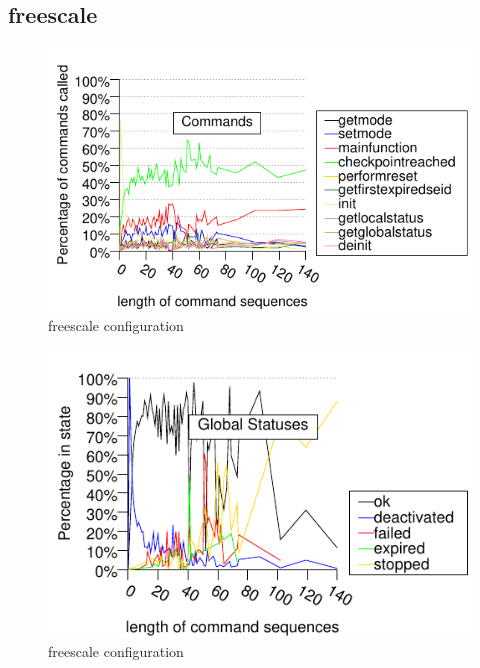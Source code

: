\subsection{freescale}

\begin{figure}[h!]
\label{FIG:COMMANDS_FREESCALE}
\caption{freescale configuration}
\begin{center}
\includegraphics{generated_pictures/history_commands_freescale.pdf}
\end{center}
\end{figure}

\begin{figure}[h!]
\label{FIG:STATUSES_FREESCALE}
\caption{freescale configuration}
\begin{center}
\includegraphics{generated_pictures/history_statuses_freescale.pdf}
\end{center}
\end{figure}

